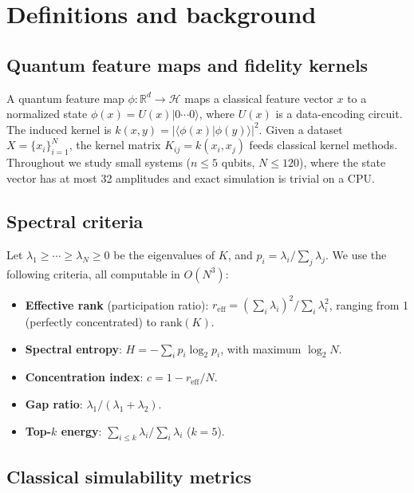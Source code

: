 \documentclass[aps,pra,preprint]{revtex4-2}
\begin{document}
\section{Definitions and background}
\label{sec:defs}

\subsection{Quantum feature maps and fidelity kernels}
\label{sec:defs-fm}

A quantum feature map $\phi:\mathbb{R}^d\to\mathcal{H}$ maps a classical feature vector
$x$ to a normalized state $\phi(x)=U(x)|0\cdots0\rangle$, where $U(x)$ is a data-encoding
circuit. The induced kernel is $k(x,y)=|\langle\phi(x)|\phi(y)\rangle|^2$. Given a dataset
$X=\{x_i\}_{i=1}^{N}$, the kernel matrix $K_{ij}=k(x_i,x_j)$ feeds classical kernel methods.
Throughout we study small systems ($n\le5$ qubits, $N\le120$), where the state vector has
at most 32 amplitudes and exact simulation is trivial on a CPU.

\subsection{Spectral criteria}
\label{sec:defs-spectral}

Let $\lambda_1\ge\cdots\ge\lambda_N\ge0$ be the eigenvalues of $K$, and
$p_i=\lambda_i/\sum_j\lambda_j$. We use the following criteria, all computable in
$O(N^3)$:

\begin{itemize}
\item \textbf{Effective rank} (participation ratio): $r_{\mathrm{eff}}=(\sum_i\lambda_i)^2 /
\sum_i\lambda_i^2$, ranging from 1 (perfectly concentrated) to $\mathrm{rank}(K)$.
\item \textbf{Spectral entropy}: $H=-\sum_i p_i\log_2 p_i$, with maximum $\log_2 N$.
\item \textbf{Concentration index}: $c=1-r_{\mathrm{eff}}/N$.
\item \textbf{Gap ratio}: $\lambda_1/(\lambda_1+\lambda_2)$.
\item \textbf{Top-$k$ energy}: $\sum_{i\le k}\lambda_i/\sum_i\lambda_i$ ($k=5$).
\end{itemize}

\subsection{Classical simulability metrics}
\label{sec:defs-simul}
\end{document}
